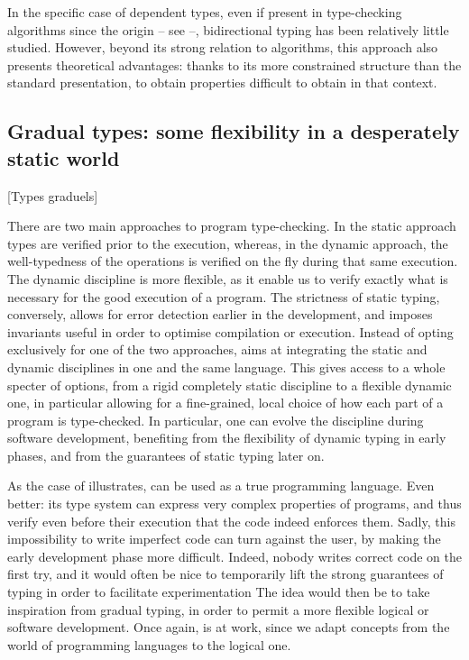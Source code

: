 In the specific case of dependent types, even if present in type-checking algorithms since
the origin – see \eg {} –, bidirectional typing has been relatively little
studied. However, beyond its strong relation to algorithms, this approach also presents
theoretical advantages: thanks to its more constrained structure than the standard presentation,
to obtain properties difficult to obtain in that context.

\subsection{Gradual types: some flexibility in a desperately static world}
  [Types graduels]
\label{sec:intro-graduel-en}

There are two main approaches to program type-checking. In the static approach%
types are verified prior to the execution, whereas, in the dynamic approach, the well-typedness
of the operations is verified on the fly during that same execution.
The dynamic discipline is more flexible, as it enable us to verify exactly what is necessary
for the good execution of a program.
The strictness of static typing, conversely, allows for error detection earlier in the
development, and imposes invariants useful in order to optimise compilation or execution.
Instead of opting exclusively for one of the two approaches, 
 aims at integrating the static and dynamic disciplines in one and the
same language. This gives access to a whole specter of options, from a rigid completely static
discipline to a flexible dynamic one, in particular allowing for a fine-grained, local choice
of how each part of a program is type-checked.
In particular, one can evolve the discipline during software development, benefiting from
the flexibility of dynamic typing in early phases, and from the guarantees of static typing
later on.

As the case of  illustrates,  can be used as a true programming language.
Even better: its type system can express very complex properties of programs, and thus
verify even before their execution that the code indeed enforces them.
Sadly, this impossibility to write imperfect code can turn against the user, by making the
early development phase more difficult. Indeed, nobody writes correct code on the first try,
and it would often be nice to temporarily lift the strong guarantees of typing in order to
facilitate experimentation The idea would then be to take inspiration from gradual typing,
in order to permit a more flexible logical or software development. Once again,
 is at work, since we adapt concepts from the world of
programming languages to the logical one.

